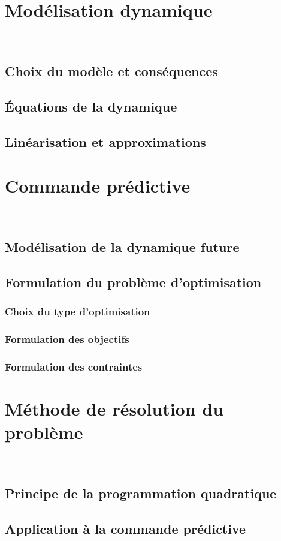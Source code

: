 \section{Modélisation dynamique}~
	\subsection{Choix du modèle et conséquences}
	\subsection{Équations de la dynamique}
	\subsection{Linéarisation et approximations}
\section{Commande prédictive}~
	\subsection{Modélisation de la dynamique future}
	\subsection{Formulation du problème d'optimisation}
		\subsubsection{Choix du type d'optimisation}
		\subsubsection{Formulation des objectifs}
		\subsubsection{Formulation des contraintes}
\section{Méthode de résolution du problème}~
	\subsection{Principe de la programmation quadratique}
	\subsection{Application à la commande prédictive}
